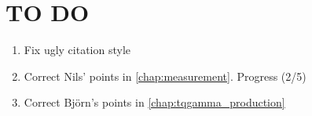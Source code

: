 \chapter{TO DO}
\begin{enumerate}
    \item Fix ugly citation style
    \item Correct Nils' points in \ref{chap:measurement}. Progress (2/5)
    \item Correct Björn's points in \ref{chap:tqgamma_production}
\end{enumerate}